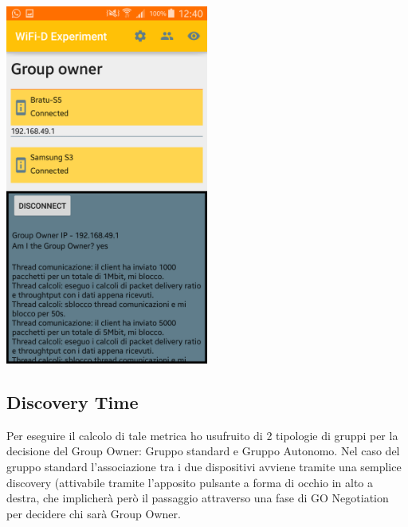 \begin{center}
\includegraphics[width=0.5\textwidth]{imgs/Server.png}
\label{server_img}%
\end{center}



\subsection{Discovery Time}

Per eseguire il calcolo di tale metrica ho usufruito di 2 tipologie di gruppi per la decisione del Group Owner: Gruppo standard e Gruppo Autonomo.
Nel caso del gruppo standard l'associazione tra i due dispositivi avviene tramite una semplice discovery (attivabile tramite l'apposito pulsante a forma di occhio in alto a destra, che implicherà però il passaggio attraverso una fase di GO Negotiation per decidere chi sarà Group Owner.


